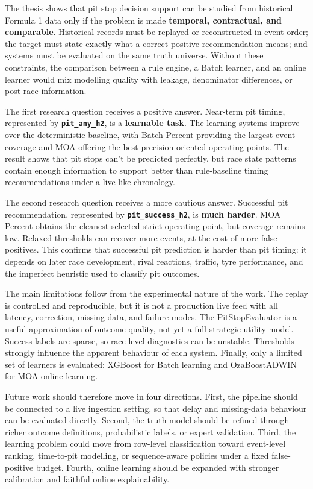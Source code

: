 The thesis shows that pit stop decision support can be studied from historical Formula 1 data only if the problem is made 
\textbf{temporal, contractual, and comparable}. Historical records must be replayed or reconstructed in event order; the target must state exactly 
what a correct positive recommendation means; and systems must be evaluated on the same truth universe. Without these constraints, the comparison 
between a rule engine, a Batch learner, and an online learner would mix modelling quality with leakage, denominator differences, or post-race information.

The first research question receives a positive answer. Near-term pit timing, represented by \textbf{\texttt{pit\_any\_h2}}, is a \textbf{learnable task}. 
The learning systems improve over the deterministic baseline, with Batch Percent providing the largest event coverage and MOA offering the 
best precision-oriented operating points. The result shows that pit stops can't be predicted perfectly, but race state patterns contain 
enough information to support better than rule-baseline timing recommendations under a live like chronology.

The second research question receives a more cautious answer. Successful pit recommendation, represented by \textbf{\texttt{pit\_success\_h2}}, 
is \textbf{much harder}. MOA Percent obtains the cleanest selected strict operating point, but coverage remains low. Relaxed thresholds can recover
more events, at the cost of more false positives. This confirms that successful pit prediction is harder than pit timing: 
it depends on later race development, rival reactions, traffic, tyre performance, and the imperfect heuristic used to classify pit outcomes.

The main limitations follow from the experimental nature of the work. The replay is controlled and reproducible, but it is not a production live 
feed with all latency, correction, missing-data, and failure modes. The PitStopEvaluator is a useful approximation of outcome quality, not yet a full 
strategic utility model. Success labels are sparse, so race-level diagnostics can be unstable. Thresholds strongly influence the apparent behaviour of 
each system. Finally, only a limited set of learners is evaluated: XGBoost for Batch learning and OzaBoostADWIN for MOA online learning.

Future work should therefore move in four directions. First, the pipeline should be connected to a live ingestion setting, so that delay and 
missing-data behaviour can be evaluated directly. Second, the truth model should be refined through richer outcome definitions, probabilistic labels, 
or expert validation. Third, the learning problem could move from row-level classification toward event-level ranking, time-to-pit modelling, or 
sequence-aware policies under a fixed false-positive budget. Fourth, online learning should be expanded with stronger calibration and faithful 
online explainability.

